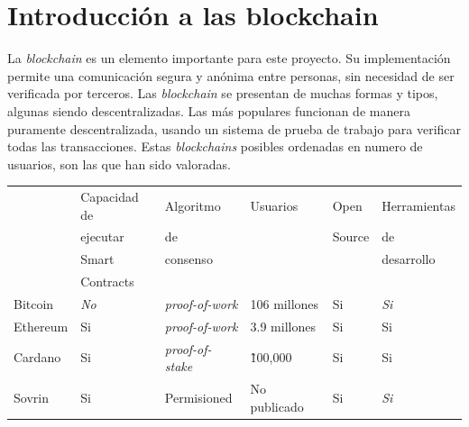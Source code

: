 \section{Introducción a las blockchain}
La \textit{blockchain} es un elemento importante para este proyecto. Su implementación permite una comunicación segura y anónima entre personas, sin necesidad de ser verificada por terceros. Las \textit{blockchain} se presentan de muchas formas y tipos, algunas siendo descentralizadas. Las más populares funcionan de manera puramente descentralizada, usando un sistema de prueba de trabajo para verificar todas las transacciones. Estas \textit{blockchains} posibles ordenadas en numero de usuarios, son las que han sido valoradas.
\begin{table}[h!]
        \begin{tabular}{|l|l|l|l|l|l|}
        \hline
                 & Capacidad de             & Algoritmo                             & Usuarios                              & Open          & Herramientas               \\
                 & ejecutar                 & de                                    &                                       & Source        & de                         \\
                 & Smart                    & consenso                              &                                       &               & desarrollo                 \\
                 & Contracts                &                                       &                                       &               &                            \\ \hline
        Bitcoin  & \textit{No}              & \textit{proof-of-work} \cite{web:pow} & 106 millones \cite{web:bitcoin_p}     & Si            & \textit{Si}                \\ \hline
        Ethereum & Si                       & \textit{proof-of-work} \cite{web:pow} & 3.9 millones \cite{web:ethereum_p}    & Si            & Si                         \\ \hline
        Cardano  & Si                       & \textit{proof-of-stake} \cite{web:pos}& \~100,000 \cite{web:cardano_p}        & Si            & Si                         \\ \hline
        Sovrin   & Si                       & Permisioned                           & No publicado                          & Si            & \textit{Si}                \\ 

\end{tabular}
\end{table}
